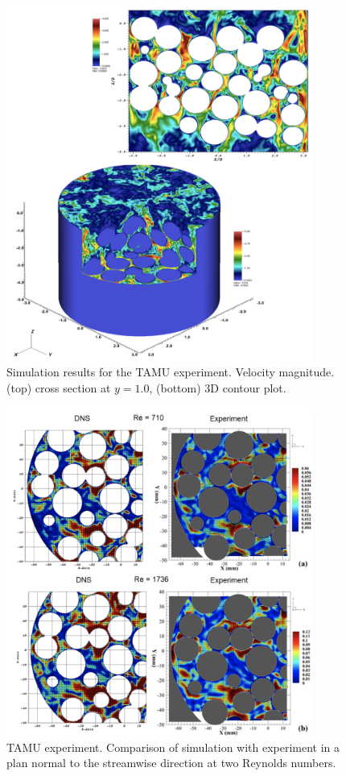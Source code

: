 \begin{figure}[!h]
\centering
\includegraphics[clip=true,width=0.9\textwidth]{Figures/pb_tamu3}
\caption{Simulation results for the TAMU experiment. Velocity magnitude. (top) cross section at $y=1.0$, (bottom) 3D contour plot. }
\label{f:tamu3}
\end{figure}

\begin{figure}[!h]
\centering
\includegraphics[clip=true,width=0.9\textwidth]{Figures/pb_tamu4}
\caption{TAMU experiment. Comparison of simulation with experiment in a plan normal to the streamwise direction at two Reynolds numbers. }
\label{f:tamu4}
\end{figure}

